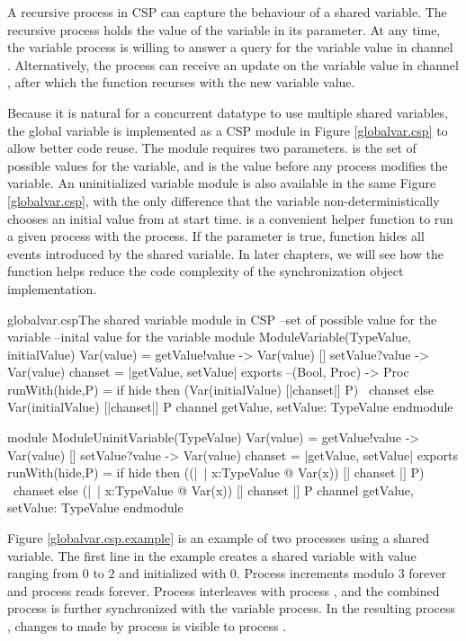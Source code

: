 \documentclass[a4paper, 12pt]{article}
\begin{document}
A recursive process in CSP can capture the behaviour of a shared variable. The recursive process holds the value of the variable in its parameter. At any time, the variable process is willing to answer a query for the variable value in channel . Alternatively, the process can receive an update on the variable value in channel , after which the function recurses with the new variable value.

Because it is natural for a concurrent datatype to use multiple shared variables, the global variable is implemented as a CSP module in Figure \ref{globalvar.csp} to allow better code reuse. The module requires two parameters.  is the set of possible values for the variable, and  is the value before any process modifies the variable. An uninitialized variable module is also available in the same Figure \ref{globalvar.csp}, with the only difference that the variable non-deterministically chooses an initial value from  at start time.  is a convenient helper function to run a given process  with the  process. If the parameter  is true,  function hides all events introduced by the shared variable. In later chapters, we will see how the  function helps reduce the code complexity of the synchronization object implementation.

\begin{cspfloat}{globalvar.csp}{The shared variable module in CSP}
--set of possible value for the variable
--inital value for the variable
module ModuleVariable(TypeValue, initialValue)
  Var(value) = getValue!value -> Var(value)
             [] setValue?value -> Var(value)
  chanset = {|getValue, setValue|}
exports
  --(Bool, Proc) -> Proc
  runWith(hide,P) = if hide then (Var(initialValue) [|chanset|] P) \ chanset
                            else  Var(initialValue) [|chanset|] P
  channel getValue, setValue: TypeValue
endmodule

module ModuleUninitVariable(TypeValue)
  Var(value) = getValue!value -> Var(value)
            [] setValue?value -> Var(value)
  chanset = {|getValue, setValue|}
exports
  runWith(hide,P) = 
    if hide then ((|~| x:TypeValue @ Var(x)) [| chanset |] P) \ chanset
    else (|~| x:TypeValue @ Var(x)) [| chanset |] P
  channel getValue, setValue: TypeValue
endmodule
\end{cspfloat}

Figure \ref{globalvar.csp.example} is an example of two processes using a shared variable. The first line in the example creates a shared variable  with value ranging from $0$ to $2$ and initialized with $0$. Process  increments  modulo $3$ forever and process  reads  forever. Process  interleaves with process , and the combined process is further synchronized with the variable  process. In the resulting process , changes to  made by process  is visible to process .
\end{document}
